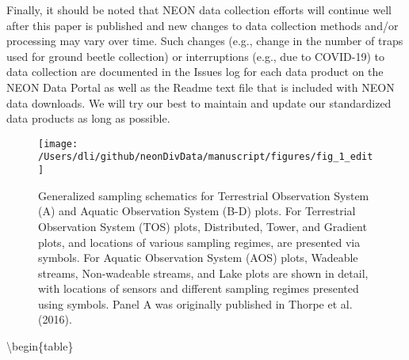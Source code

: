 \documentclass[
  12pt,
]{article}
\begin{document}
Finally, it should be noted that NEON data collection efforts will continue well after this paper is published and new changes to data collection methods and/or processing may vary over time. Such changes (e.g., change in the number of traps used for ground beetle collection) or interruptions (e.g., due to COVID-19) to data collection are documented in the Issues log for each data product on the NEON Data Portal as well as the Readme text file that is included with NEON data downloads. We will try our best to maintain and update our standardized data products as long as possible.



\begin{figure}

{\centering \texttt{[image: /Users/dli/github/neonDivData/manuscript/figures/fig\_1\_edit]} 

}

\caption{Generalized sampling schematics for Terrestrial Observation System (A) and Aquatic Observation System (B-D) plots. For Terrestrial Observation System (TOS) plots, Distributed, Tower, and Gradient plots, and locations of various sampling regimes, are presented via symbols. For Aquatic Observation System (AOS) plots, Wadeable streams, Non-wadeable streams, and Lake plots are shown in detail, with locations of sensors and different sampling regimes presented using symbols. Panel A was originally published in Thorpe et al. (2016).}\label{fig:Fig1Design}
\end{figure}



\textbackslash begin\{table\}

\caption{\label{tab:dataMapping}Mapping NEON data products to ecocomDP formatted data packages with abundances \emph{standardized} to observation effort. IDs in the \texttt{L0\ to\ L1\ ecocomDP\ workflow\ ID} columns were used in the R package \texttt{ecocomDP} to standardize organismal data.}
\centering
\end{document}
